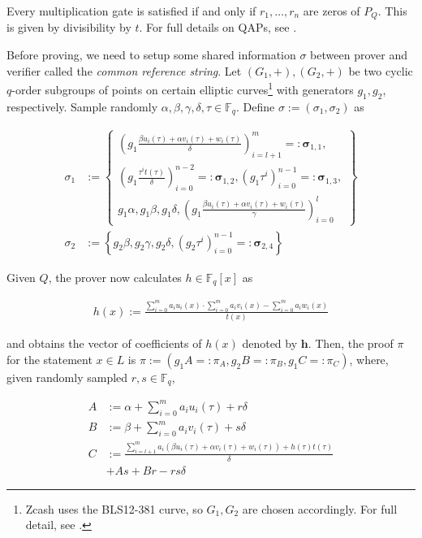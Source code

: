\documentclass{article}
\begin{document}
Every multiplication gate is satisfied if and only if $r_1,\ldots,r_n$ are zeros of $P_Q$.
This is given by divisibility by $t$.
For full details on QAPs, see \cite{gennaro:qap}.

Before proving, we need to setup some shared information $\sigma$ between prover and verifier called the \textit{common reference string}.
Let $(G_1, +), (G_2, +)$ be two cyclic $q$-order subgroups of points on certain elliptic curves\footnote{Zcash uses the BLS12-381\cite{barreto:bls} curve, so $G_1,G_2$ are chosen accordingly. For full detail, see \cite{hopwood:zcash}. } with generators $g_1, g_2$, respectively.
Sample randomly $\alpha, \beta, \gamma, \delta, \tau \in \mathbb{F}_q$. Define $\sigma := (\sigma_1, \sigma_2)$ as

\begin{adjustbox}{max width=.5\textwidth}
\parbox{\linewidth}{
\begin{align*}
        \sigma_1 &:= \left\{\begin{aligned}\left(g_1\frac{\beta u_i(\tau) + \alpha v_i(\tau) + w_i(\tau)}{\delta}\right)_{i=l+1}^m =: \boldsymbol\sigma_{1,1},\\
        \left(g_1\frac{\tau^i t(\tau)}{\delta}\right)_{i=0}^{n-2} =: \boldsymbol\sigma_{1,2}, \left(g_1{\tau^i}\right)_{i=0}^{n-1} =: \boldsymbol\sigma_{1,3},\\
        g_1\alpha, g_1\beta, g_1\delta, \left(g_1\frac{\beta u_i(\tau) + \alpha v_i(\tau) + w_i(\tau)}{\gamma}\right)_{i=0}^l\end{aligned}\right\} \\
        \sigma_2 &:= \left\{g_2\beta, g_2\gamma, g_2\delta, (g_2{\tau^i})_{i=0}^{n-1} =: \boldsymbol\sigma_{2,4}\right\}
\end{align*}}
\end{adjustbox}

Given $Q$, the prover now calculates $h \in \mathbb{F}_q[x]$ as

\begin{align}h(x) := \frac{\sum_{i=0}^m a_iu_i(x) \cdot \sum_{i=0}^m a_iv_i(x) - \sum_{i=0}^{m} a_iw_i(x)}{t(x)} \label{eq:h}\end{align}

and obtains the vector of coefficients of $h(x)$ denoted by $\boldsymbol{h}$.
Then, the proof $\pi$ for the statement $x \in L$ is $\pi := (g_1A =: \pi_A, g_2B =: \pi_B, g_1C =: \pi_C)$, where, given randomly sampled $r,s\in \mathbb{F}_q$,

\begin{align}
        A &:= \alpha + \sum_{i=0}^m a_iu_i(\tau) + r\delta \label{eq:A} \\
        B &:= \beta + \sum_{i=0}^m a_iv_i(\tau) + s\delta \label{eq:B} \\
        C &:= \frac{\sum_{i=l+1}^m a_i(\beta u_i(\tau) + \alpha v_i(\tau) + w_i(\tau)) + h(\tau)t(\tau)}{\delta} \label{eq:C} \\
        & + As + Br - rs\delta \nonumber
\end{align}
\end{document}
